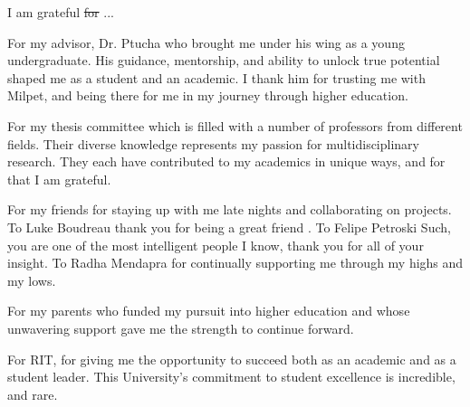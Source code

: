 \documentclass[12pt,american]{report}
\providecommand{\DIFaddtex}[1]{{\protect\color{blue}\uwave{#1}}} %
\providecommand{\DIFdeltex}[1]{{\protect\color{red}\sout{#1}}}                      %
\providecommand{\DIFaddbegin}{} %
\providecommand{\DIFaddend}{} %
\providecommand{\DIFdelbegin}{} %
\providecommand{\DIFdelend}{} %
\providecommand{\DIFadd}[1]{\texorpdfstring{\DIFaddtex{#1}}{#1}} %
\providecommand{\DIFdel}[1]{\texorpdfstring{\DIFdeltex{#1}}{}} %
\newcommand{\DIFscaledelfig}{0.5}
\newlength{\DIFdelgraphicswidth} %
\newlength{\DIFdelgraphicsheight} %
\newcommand{\DIFaddincludegraphics}[2][]{{\color{blue}\fbox{\DIFOincludegraphics[#1]{#2}}}} %
\newcommand{\DIFdelincludegraphics}[2][]{%
\sbox{\DIFdelgraphicsbox}{\DIFOincludegraphics[#1]{#2}}%
\settoboxwidth{\DIFdelgraphicswidth}{\DIFdelgraphicsbox} %
\settoboxtotalheight{\DIFdelgraphicsheight}{\DIFdelgraphicsbox} %
\scalebox{\DIFscaledelfig}{%
\parbox[b]{\DIFdelgraphicswidth}{\usebox{\DIFdelgraphicsbox}\\[-\baselineskip] \rule{\DIFdelgraphicswidth}{0em}}\llap{\resizebox{\DIFdelgraphicswidth}{\DIFdelgraphicsheight}{%
\setlength{\unitlength}{\DIFdelgraphicswidth}%
\begin{picture}(1,1)%
\thicklines\linethickness{2pt} %
{\color[rgb]{1,0,0}\put(0,0){\framebox(1,1){}}}%
{\color[rgb]{1,0,0}\put(0,0){\line( 1,1){1}}}%
{\color[rgb]{1,0,0}\put(0,1){\line(1,-1){1}}}%
\end{picture}%
}\hspace*{3pt}}} %
} %
\DeclareRobustCommand{\DIFaddbegin}{\DIFOaddbegin \let\includegraphics\DIFaddincludegraphics} %
\DeclareRobustCommand{\DIFaddend}{\DIFOaddend \let\includegraphics\DIFOincludegraphics} %
\DeclareRobustCommand{\DIFdelbegin}{\DIFOdelbegin \let\includegraphics\DIFdelincludegraphics} %
\DeclareRobustCommand{\DIFdelend}{\DIFOaddend \let\includegraphics\DIFOincludegraphics} %
\begin{document}
%
\vfill
\begin{center}
\indent I am grateful \DIFdelbegin \DIFdel{for }\DIFdelend ...


For my advisor, Dr. Ptucha who brought me under his wing as a young undergraduate.  His guidance, mentorship, and ability to unlock true potential shaped me as a student and an academic.  I thank him for trusting me with Milpet, and being there for me in my journey through higher education.  


For my thesis committee which is filled with a number of professors from different fields.  Their diverse knowledge represents my passion for multidisciplinary research.  They each have contributed to my academics in unique ways, and for that I am grateful.


For my friends for staying up with me late nights and collaborating on projects.  To Luke Boudreau thank you for being a great friend \DIFaddbegin \DIFadd{and teammate}\DIFaddend .  To Felipe Petroski Such, you are one of the most intelligent people I know, thank you for all of your insight. To Radha Mendapra for continually supporting me through my highs and my lows.


For my parents who funded my pursuit into higher education and whose unwavering support gave me the strength to continue forward.


For RIT, for giving me the opportunity to succeed both as an academic and as a student leader.  This University's commitment to student excellence is incredible, and rare.


\end{center}
\vfill

\newcommand{\etc} {\emph{etc.\/}}
\newcommand{\etal}{\emph{et~al.\/}}
\newcommand{\eg}  {\emph{e.g.\/}}
\newcommand{\ie}  {\emph{i.e.\/}}
\end{document}
